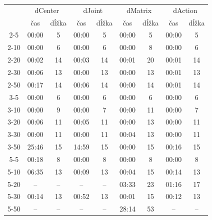 \documentclass[
  printed, %
  oneside, %
  notable,   %
  nolof,     %
  nolot,     %
]{fithesis3}
\begin{document}
\begin{table}[hp!]
\centering
\begin{tabular}{c|cc|cc|cc|cc}
\multirow{2}{*}{} & \multicolumn{2}{c|}{dCenter} & \multicolumn{2}{c|}{dJoint} & \multicolumn{2}{c|}{dMatrix} & \multicolumn{2}{c}{dAction} \\
 & čas & dĺžka & čas & dĺžka & čas & dĺžka & čas & dĺžka \\ \hline
2-5  & 00:00 & 5  & 00:00 & 5  & \cellcolor{table-green}00:00 & \cellcolor{table-green}5  & 00:00 & 5  \\
2-10  & 00:00 & 6  & 00:00 & 6  & 00:00 & 8  & \cellcolor{table-green}00:00 & \cellcolor{table-green}6  \\
2-20  & 00:02 & 14  & 00:03 & 14  & 00:01 & 20  & \cellcolor{table-green}00:01 & \cellcolor{table-green}14  \\
2-30  & 00:06 & 13  & 00:00 & 13  & \cellcolor{table-green}00:00 & \cellcolor{table-green}13  & 00:01 & 13  \\
2-50  & 00:17 & 14  & 00:06 & 14  & \cellcolor{table-green}00:00 & \cellcolor{table-green}14  & 00:01 & 14  \\ \hline
3-5  & 00:00 & 6  & 00:00 & 6  & \cellcolor{table-green}00:00 & \cellcolor{table-green}6  & 00:00 & 6  \\
3-10  & 00:00 & 9  & 00:00 & 7  & 00:00 & 11  & \cellcolor{table-green}00:00 & \cellcolor{table-green}7  \\
3-20  & 00:06 & 11  & 00:05 & 11  & 00:00 & 13  & \cellcolor{table-green}00:00 & \cellcolor{table-green}11  \\
3-30  & 00:00 & 11  & 00:00 & 11  & 00:04 & 13  & \cellcolor{table-green}00:00 & \cellcolor{table-green}11  \\
3-50  & 25:46 & 15  & 14:59 & 15  & \cellcolor{table-green}00:00 & \cellcolor{table-green}15  & 00:16 & 15  \\ \hline
5-5  & 00:18 & 8  & 00:00 & 8  & \cellcolor{table-green}00:00 & \cellcolor{table-green}8  & 00:00 & 8  \\
5-10  & 06:35 & 13  & 00:09 & 13  & \cellcolor{table-green}00:04 & \cellcolor{table-green}15  & 00:14 & 13  \\
5-20  & -- & --  & -- & --  & 03:33 & 23  & \cellcolor{table-green}01:16 & \cellcolor{table-green}17  \\
5-30  & 00:14 & 13  & 00:52 & 13  & \cellcolor{table-green}00:01 & \cellcolor{table-green}15  & 00:12 & 13  \\
5-50  & -- & --  & -- & --  & \cellcolor{table-green}28:14 & \cellcolor{table-green}53  & -- & --  \\ \hline

\end{tabular}
\end{table}
\end{document}
